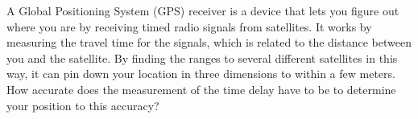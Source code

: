 A Global Positioning System (GPS) receiver is a device
that lets you figure out where you are by receiving timed radio
signals from satellites. It works by measuring the
travel time for the signals, which is related to the
distance between you and the satellite. By finding the
ranges to several different satellites in this way, it can
pin down your location in three dimensions to within a few
meters. How accurate does the measurement of the time delay
have to be to determine your position to this accuracy?
